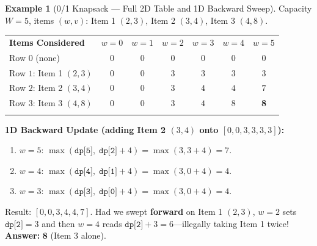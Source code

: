 \documentclass[11pt,a4paper]{article}
\theoremstyle{definition}
\newtheorem{example}{Example}[section]
\begin{document}
\begin{example}[0/1 Knapsack --- Full 2D Table and 1D Backward Sweep]
Capacity $W = 5$, items $(w, v)$: Item 1 $(2, 3)$, Item 2 $(3, 4)$, Item 3 $(4, 8)$.

\begin{center}
\begingroup\small{}
\begin{tabular}{lcccccc}
\arrayrulecolor{primaryblue}\toprule[1.1pt]
\rowcolor{primaryblue!10}
\textcolor{primaryblue}{\textbf{Items Considered}} & \textcolor{primaryblue}{\textbf{$w=0$}} & \textcolor{primaryblue}{\textbf{$w=1$}} & \textcolor{primaryblue}{\textbf{$w=2$}} & \textcolor{primaryblue}{\textbf{$w=3$}} & \textcolor{primaryblue}{\textbf{$w=4$}} & \textcolor{primaryblue}{\textbf{$w=5$}} \\
\arrayrulecolor{codeframe}\midrule[0.6pt]
Row $0$ (none) & $0$ & $0$ & $0$ & $0$ & $0$ & $0$ \\
Row $1$: Item 1 $(2, 3)$ & $0$ & $0$ & $3$ & $3$ & $3$ & $3$ \\
Row $2$: Item 2 $(3, 4)$ & $0$ & $0$ & $3$ & $4$ & $4$ & $7$ \\
Row $3$: Item 3 $(4, 8)$ & $0$ & $0$ & $3$ & $4$ & $8$ & \textbf{8} \\
\arrayrulecolor{primaryblue}\bottomrule[1.1pt]
\end{tabular}
\endgroup
\end{center}

\textbf{1D Backward Update (adding Item 2 $(3, 4)$ onto $[0, 0, 3, 3, 3, 3]$):}
\begin{enumerate}
    \item $w = 5$: $\max(\texttt{dp[5]},\; \texttt{dp[2]} + 4) = \max(3, 3 + 4) = 7$.
    \item $w = 4$: $\max(\texttt{dp[4]},\; \texttt{dp[1]} + 4) = \max(3, 0 + 4) = 4$.
    \item $w = 3$: $\max(\texttt{dp[3]},\; \texttt{dp[0]} + 4) = \max(3, 0 + 4) = 4$.
\end{enumerate}
Result: $[0, 0, 3, 4, 4, 7]$. Had we swept \textbf{forward} on Item 1 $(2, 3)$, $w = 2$ sets $\texttt{dp[2]} = 3$ and then $w = 4$ reads $\texttt{dp[2]} + 3 = 6$---illegally taking Item 1 twice! \textbf{Answer:} $\mathbf{8}$ (Item 3 alone).
\end{example}
\end{document}
